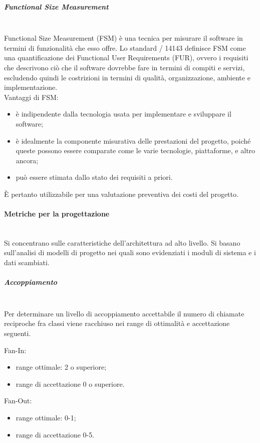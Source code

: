 \subparagraph{Functional Size Measurement}\mbox{}\\
Functional Size Measurement (FSM) è una tecnica per misurare il software in termini di funzionalità che esso offre. Lo standard / 14143 definisce FSM come una quantificazione dei Functional User Requirements (FUR), ovvero i requisiti che descrivono ciò che il software dovrebbe fare in termini di compiti e servizi, escludendo quindi le costrizioni in termini di qualità, organizzazione, ambiente e implementazione.\\
Vantaggi di FSM:
\begin{itemize}
	\item è indipendente dalla tecnologia usata per implementare e sviluppare il software;
	\item è idealmente la componente misurativa delle prestazioni del progetto, poiché queste possono essere comparate come le varie tecnologie, piattaforme, e altro ancora;
	\item può essere stimata dallo stato dei requisiti a priori.
\end{itemize}
\`{E} pertanto utilizzabile per una valutazione preventiva dei costi del progetto.

\paragraph{Metriche per la progettazione}\mbox{}\\
Si concentrano sulle caratteristiche dell'architettura ad alto livello. Si basano sull'analisi di modelli di progetto nei quali sono evidenziati i moduli di sistema e i dati scambiati.

\subparagraph{Accoppiamento}\mbox{}\\
Per determinare un livello di accoppiamento accettabile il numero di chiamate reciproche fra classi viene racchiuso nei range di ottimalità e accettazione seguenti.

Fan-In:
\begin{itemize}
	\item range ottimale: 2 o superiore;
	\item range di accettazione 0 o superiore.
\end{itemize}

Fan-Out:
\begin{itemize}
	\item range ottimale: 0-1;
	\item range di accettazione 0-5.
\end{itemize}

